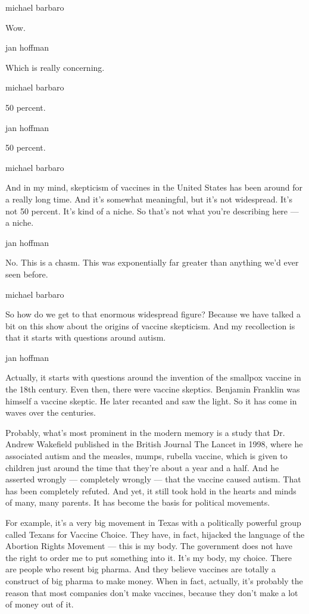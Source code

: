 michael barbaro

Wow.

jan hoffman

Which is really concerning.

michael barbaro

50 percent.

jan hoffman

50 percent.

michael barbaro

And in my mind, skepticism of vaccines in the United States has been
around for a really long time. And it's somewhat meaningful, but it's
not widespread. It's not 50 percent. It's kind of a niche. So that's not
what you're describing here --- a niche.

jan hoffman

No. This is a chasm. This was exponentially far greater than anything
we'd ever seen before.

michael barbaro

So how do we get to that enormous widespread figure? Because we have
talked a bit on this show about the origins of vaccine skepticism. And
my recollection is that it starts with questions around autism.

jan hoffman

Actually, it starts with questions around the invention of the smallpox
vaccine in the 18th century. Even then, there were vaccine skeptics.
Benjamin Franklin was himself a vaccine skeptic. He later recanted and
saw the light. So it has come in waves over the centuries.

Probably, what's most prominent in the modern memory is a study that Dr.
Andrew Wakefield published in the British Journal The Lancet in 1998,
where he associated autism and the measles, mumps, rubella vaccine,
which is given to children just around the time that they're about a
year and a half. And he asserted wrongly --- completely wrongly --- that
the vaccine caused autism. That has been completely refuted. And yet, it
still took hold in the hearts and minds of many, many parents. It has
become the basis for political movements.

For example, it's a very big movement in Texas with a politically
powerful group called Texans for Vaccine Choice. They have, in fact,
hijacked the language of the Abortion Rights Movement --- this is my
body. The government does not have the right to order me to put
something into it. It's my body, my choice. There are people who resent
big pharma. And they believe vaccines are totally a construct of big
pharma to make money. When in fact, actually, it's probably the reason
that most companies don't make vaccines, because they don't make a lot
of money out of it.

